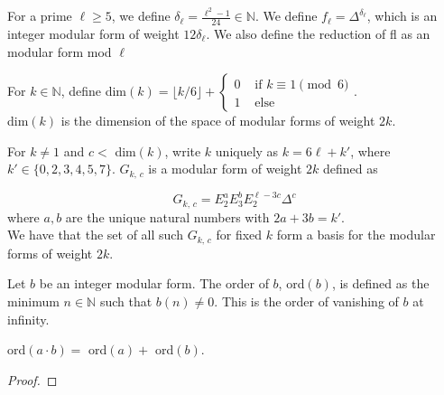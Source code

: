 \begin{definition}
  \label{def:fl}
  \leanok
  For a prime $\ell \ge 5$, we define $\delta_\ell = \frac{\ell^2 - 1}{24} \in \mathbb{N}$. 
  We define $f_\ell = \Delta^{\delta_\ell}$, which is an integer modular form of weight $12 \delta_\ell$. 
  We also define the reduction of fl as an modular form mod $\ell$
\end{definition}


\begin{definition}
  \label{def:dim}
  \leanok
  For $k \in \mathbb{N}$, define dim$(k) = \lfloor k / 6 \rfloor +         
        \begin{cases}
            0 & \text{ if } k\equiv 1\pmod{6} \\
            1 & \text{ else }
        \end{cases} $. \\
  dim$(k)$ is the dimension of the space of modular forms of weight $2k$.
\end{definition}


\begin{definition}
  \label{def:G}
  \leanok

  For $ k \ne 1$ and $c < $ dim$(k)$, 
  write $k$ uniquely as $k = 6\ell + k'$, where $k' \in \{0, 2, 3, 4, 5, 7\}$.
  $G_{k,\, c}$ is a modular form of weight $2k$ defined as 

  \[G_{k,\, c} = E_2 ^ a E_3 ^ b E_2 ^ {\ell - 3c} \Delta ^ c \]
  where $a, b$ are the unique natural numbers with $2a + 3b = k'.$ \\
  We have that the set of all such $G_{k,\, c}$ for fixed $k$ form a basis for the modular forms of weight $2k$.

\end{definition}

\begin{definition} [ord]
  \label{def:ord}
  \leanok
  Let $b$ be an integer modular form. The order of $b$, ord$(b)$, is defined as the minimum $n \in \mathbb{N}$ such that $b(n) \neq 0$.
  This is the order of vanishing of $b$ at infinity.
\end{definition}

\begin{theorem}
  \label{thm:ord_mul}
  \leanok
  ord$(a \cdot b) = $ ord$(a) + $ ord$(b)$.
\end{theorem}
\begin{proof}
  \leanok
\end{proof}

